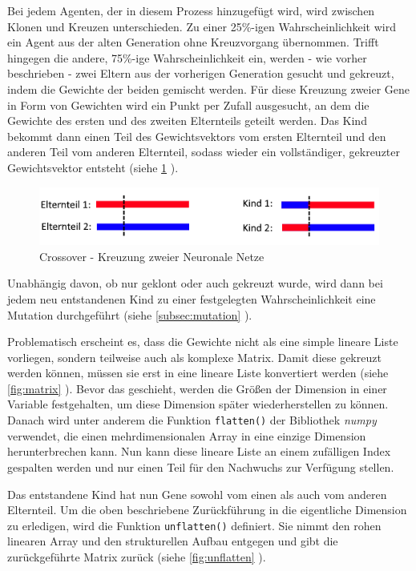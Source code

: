 \documentclass[parskip=half,titlepage]{scrartcl}
\begin{document}
Bei jedem Agenten, der in diesem Prozess hinzugefügt wird, wird zwischen Klonen und Kreuzen unterschieden. Zu einer 25\%-igen Wahrscheinlichkeit wird ein Agent aus der alten Generation ohne Kreuzvorgang übernommen. Trifft hingegen die andere, 75\%-ige Wahrscheinlichkeit ein, werden - wie vorher beschrieben - zwei Eltern aus der vorherigen Generation gesucht und gekreuzt, indem die Gewichte der beiden gemischt werden. Für diese Kreuzung zweier Gene in Form von Gewichten wird ein Punkt per Zufall ausgesucht, an dem die Gewichte des ersten und des zweiten Elternteils geteilt werden. Das Kind bekommt dann einen Teil des Gewichtsvektors vom ersten Elternteil und den anderen Teil vom anderen Elternteil, sodass wieder ein vollständiger, gekreuzter Gewichtsvektor entsteht (siehe \cref{fig:crossover_bild} ). 


\begin{figure}[h]
\centering
 \includegraphics[scale=0.75]{Abbildungen/Crossover.png}
 \caption{Crossover - Kreuzung zweier Neuronale Netze}
 \label{fig:crossover_bild}
\end{figure}


Unabhängig davon, ob nur geklont oder auch gekreuzt wurde, wird dann bei jedem neu entstandenen Kind zu einer festgelegten Wahrscheinlichkeit eine Mutation durchgeführt (siehe  \cref{subsec:mutation} ).

Problematisch erscheint es, dass die Gewichte nicht als eine simple lineare Liste vorliegen, sondern teilweise auch als komplexe Matrix. Damit diese gekreuzt werden können, müssen sie erst in eine lineare Liste konvertiert werden (siehe \cref{fig:matrix} ). Bevor das geschieht, werden die Größen der Dimension in einer Variable festgehalten, um diese Dimension später wiederherstellen zu können. Danach wird unter anderem die Funktion \lstinline|flatten()| der Bibliothek \textit{numpy} verwendet, die einen mehrdimensionalen Array in eine einzige Dimension herunterbrechen kann. Nun kann diese lineare Liste an einem zufälligen Index gespalten werden und nur einen Teil für den Nachwuchs zur Verfügung stellen. 

Das entstandene Kind hat nun Gene sowohl vom einen als auch vom anderen Elternteil. Um die oben beschriebene Zurückführung in die eigentliche Dimension zu erledigen, wird die Funktion \lstinline|unflatten()| definiert. Sie nimmt den rohen linearen Array und den strukturellen Aufbau entgegen und gibt die zurückgeführte Matrix zurück (siehe \cref{fig:unflatten} ). 
\end{document}
